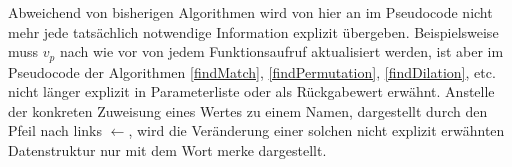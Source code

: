 \begin{algorithm}
\DontPrintSemicolon
\caption{$\Const{findMatch} \colon M \times T \rightarrow \mathit{Bool}$}\label{findMatch}

 {
}
\end{algorithm}

\begin{algorithm}
\DontPrintSemicolon
\caption{$\Const{rematch} \colon M \times T \rightarrow \mathit{Bool}$}\label{rematch}
 {
	 {
	}
	 {
	}
	 {
	}
}        
\end{algorithm}

Abweichend von bisherigen Algorithmen wird von hier an im Pseudocode nicht mehr jede tatsächlich notwendige Information explizit übergeben. Beispielsweise muss $v_p$ nach wie vor von jedem Funktionsaufruf aktualisiert werden, ist aber im Pseudocode der Algorithmen \ref{findMatch}, \ref{findPermutation}, \ref{findDilation}, etc. nicht länger explizit in Parameterliste oder als Rückgabewert erwähnt.
Anstelle der konkreten Zuweisung eines Wertes zu einem Namen, dargestellt durch den Pfeil nach links \glqq $\leftarrow$\grqq{}, wird die Veränderung einer solchen nicht explizit erwähnten Datenstruktur nur mit dem Wort \glqq merke\grqq{} dargestellt.

